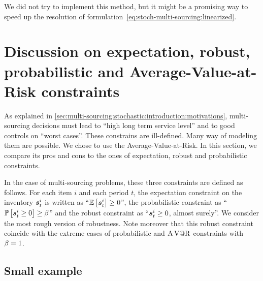 We did not try to implement this method, but it might be a promising way to speed up the resolution of formulation~\eqref{eq:stoch-multi-sourcing:linearized}.


\section{Discussion on expectation, robust, probabilistic and Average-Value-at-Risk constraints}
\label{sec:multi-sourcing:stochastic:discussion}


As explained in \cref{sec:multi-sourcing:stochastic:introduction:motivations}, multi-sourcing decisions must lead to ``high long term service level'' and to good controls on ``worst cases''.
These constrains are ill-defined.
Many way of modeling them are possible.
We chose to use the Average-Value-at-Risk.
In this section, we compare its pros and cons to the ones of expectation, robust and probabilistic constraints.


In the case of multi-sourcing problems, these three constraints are defined as follows.
For each item $i$ and each period $t$, the expectation constraint on the inventory $\va\inventory_t^i$ is written as ``$\espe\sqbracket{\va\inventory_t^i}\ge0$'', the probabilistic constraint as ``$\prob\sqbracket{\va\inventory_t^i\ge0}\ge\servicelvl$'' and the robust constraint as ``$\va\inventory_t^i\ge0$, almost surely''.
We consider the most rough version of robustness.
Note moreover that this robust constraint coincide with the extreme cases of probabilistic and $\operatorname{A\operatorname{V@R}}$ constraints with $\beta=1$.


\subsection{Small example}
\label{sec:multi-sourcing:stochastic:discussion:small-example}


